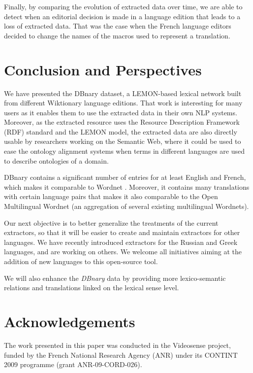 \documentclass[sw]{iosart2c}
\begin{document}
Finally, by comparing the evolution of extracted data over time, we are able to detect when an editorial decision is made in a language edition that leads to a loss of extracted data. That was the case when the French language editors decided to change the names of the macros used to represent a translation. 

\section{Conclusion and Perspectives}

We have presented the DBnary dataset, a LEMON-based lexical network built from different Wiktionary language editions. That work is interesting for many users as it enables them to use the extracted data in their own NLP systems. Moreover, as the extracted resource uses the Resource Description Framework (RDF) standard and the LEMON model, the extracted data are also directly usable by researchers working on the Semantic Web, where it could be used to ease the ontology alignment systems when terms in different languages are used to describe ontologies of a domain.

DBnary contains a significant number of entries for at least English and French, which makes it comparable to Wordnet \cite{wordnet-fellbaum}. Moreover, it contains many translations with certain language pairs that makes it also comparable to the Open Multilingual Wordnet \cite{DBLP:conf/acl/BondF13} (an aggregation of several existing multilingual Wordnets).

Our next objective is to better generalize the treatments of the current extractors, so that it will be easier to create and maintain extractors for other languages. We have recently introduced extractors for the Russian and Greek languages, and are working on others. We welcome all initiatives aiming at the addition of new languages to this open-source tool. 

We will also enhance the \textit{DBnary} data by providing more lexico-semantic relations and translations linked on the lexical sense level.

\section{Acknowledgements}

The work presented in this paper was conducted in the Videosense project, funded by the French National Research Agency (ANR) under its CONTINT 2009 programme (grant ANR-09-CORD-026).

   



\end{document}
